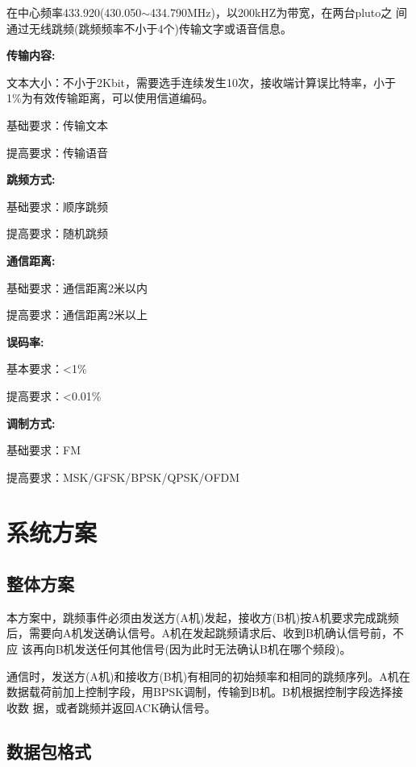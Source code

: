 \documentclass[12pt]{ctexart}
\begin{document}
 在中心频率433.920(430.050$\sim$434.790MHz)，以200kHZ为带宽，在两台pluto之
 间通过无线跳频(跳频频率不小于4个)传输文字或语音信息。
 
\bigskip
\noindent \textbf{传输内容:}

 文本大小：不小于2Kbit，需要选手连续发生10次，接收端计算误比特率，小于
 1\%为有效传输距离，可以使用信道编码。

 基础要求：传输文本 

 提高要求：传输语音
 
\bigskip
\noindent \textbf{跳频方式:}

 基础要求：顺序跳频

 提高要求：随机跳频 
 
\bigskip
\noindent \textbf{通信距离:}

基础要求：通信距离2米以内

提高要求：通信距离2米以上 

\bigskip
\noindent \textbf{误码率:}

基本要求：<1\%

提高要求：<0.01\% 

\bigskip
\noindent \textbf{调制方式:}

基础要求：FM

提高要求：MSK/GFSK/BPSK/QPSK/OFDM



\section{系统方案}

\subsection{整体方案}

本方案中，跳频事件必须由发送方(A机)发起，接收方(B机)按A机要求完成跳频
后，需要向A机发送确认信号。A机在发起跳频请求后、收到B机确认信号前，不应
该再向B机发送任何其他信号(因为此时无法确认B机在哪个频段)。

通信时，发送方(A机)和接收方(B机)有相同的初始频率和相同的跳频序列。A机在
数据载荷前加上控制字段，用BPSK调制，传输到B机。B机根据控制字段选择接收数
据，或者跳频并返回ACK确认信号。

\subsection{数据包格式}
\end{document}
